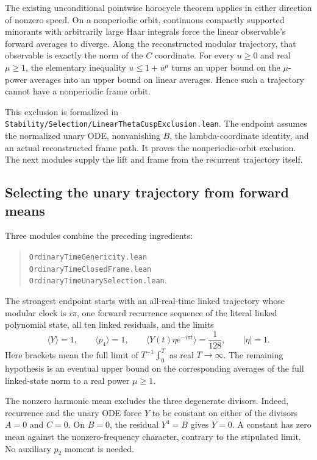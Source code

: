 \documentclass[11pt]{article}
\newcommand{\code}[1]{{\small\nolinkurl{#1}}}
\begin{document}
The existing unconditional pointwise horocycle theorem applies in either
direction of nonzero speed. On a nonperiodic orbit, continuous compactly
supported minorants with arbitrarily large Haar integrals force the linear
observable's forward averages to diverge. Along the reconstructed modular
trajectory, that observable is exactly the norm of the $C$ coordinate.
For every $u\ge0$ and real $\mu\ge1$, the elementary inequality
$u\le1+u^\mu$ turns an upper bound on the $\mu$-power averages into an
upper bound on linear averages. Hence such a trajectory cannot have a
nonperiodic frame orbit.

This exclusion is formalized in
\code{Stability/Selection/LinearThetaCuspExclusion.lean}. The endpoint
assumes the normalized unary ODE, nonvanishing $B$, the lambda-coordinate
identity, and an actual reconstructed frame path. It proves the
nonperiodic-orbit exclusion. The next modules supply the lift and frame
from the recurrent trajectory itself.

\subsection{Selecting the unary trajectory from forward means}

Three modules combine the preceding ingredients:
\begin{quote}
\code{OrdinaryTimeGenericity.lean}\\
\code{OrdinaryTimeClosedFrame.lean}\\
\code{OrdinaryTimeUnarySelection.lean}.
\end{quote}
The strongest endpoint starts with an all-real-time linked trajectory
whose modular clock is $i\pi$, one forward recurrence sequence of the
literal linked polynomial state, all ten linked residuals, and the limits
\[
 \langle Y\rangle=1,\qquad \langle p_4\rangle=1,\qquad
 \langle Y(t)\eta e^{-i\pi t}\rangle=\frac1{128},\qquad |\eta|=1.
\]
Here brackets mean the full limit of $T^{-1}\int_0^T$ as real $T\to\infty$.
The remaining hypothesis is an eventual upper bound on the corresponding
averages of the full linked-state norm to a real power $\mu\ge1$.

The nonzero harmonic mean excludes the three degenerate divisors.
Indeed, recurrence and the unary ODE force $Y$ to be constant on either
of the divisors $A=0$ and $C=0$. On $B=0$, the residual $Y^4=B$ gives
$Y=0$. A constant has zero mean against the nonzero-frequency character,
contrary to the stipulated limit. No auxiliary $p_2$ moment is needed.
\end{document}
